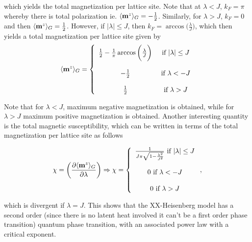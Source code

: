 \documentclass{homework}
\begin{document}
which yields the total magnetization per lattice site. Note that at $\lambda < J$, $k_F = \pi$ whereby there is total polarization ie. $\langle {{\bf m}}^{z} \rangle_{G} = -\frac{1}{2}$. Similarly, for $\lambda > J$, $k_F = 0$ and then $\langle {{\bf m}}^{z} \rangle_{G} = \frac{1}{2}$. However, if $|\lambda| \leq J$, then $k_F = \arccos\bigg(\frac{\lambda}{J}\bigg)$, which then yields a total magnetization per lattice site given by 
\begin{equation} \langle {{\bf m}}^{z} \rangle_{G}  = \left\{
    \begin{array}{cc}
          \frac{1}{2} - \frac{1}{\pi}\arccos\bigg(\frac{\lambda}{J}\bigg)&  \textnormal{ if } |\lambda| \leq J  \\
          \\
          -\frac{1}{2} & \textnormal{ if } \lambda < -J  \\
          \\
          \frac{1}{2} & \textnormal{ if } \lambda > J  \\
    \end{array} \right.
\end{equation}

Note that for $\lambda < J$, maximum negative magnetization is obtained, while for $\lambda > J$ maximum positive magnetization is obtained. Another interesting quantity is the total magnetic susceptibility, which can be written in terms of the total magnetization per lattice site as follows 

\begin{align}
    \chi = \bigg(\frac{\partial \langle {{\bf m}}^{z} \rangle_{G}}{\partial \lambda}\bigg) \Rightarrow \chi = \left\{ \begin{array}{cc} 
         \frac{1}{J \pi \sqrt{1- \frac{\lambda^2}{J^2}}} \textnormal{ if } |\lambda| \leq J  \\
         \\
          0 \textnormal{ if } \lambda < -J \\ 
         \\
          0 \textnormal{ if } \lambda > J  \\
              \end{array} \right., \label{}
\end{align}

which is divergent if $\lambda = J$. This shows that the XX-Heisenberg model has a second order (since there is no latent heat involved it can't be a first order phase transition) quantum phase transition, with an associated power law with a critical exponent.  \\
\end{document}

